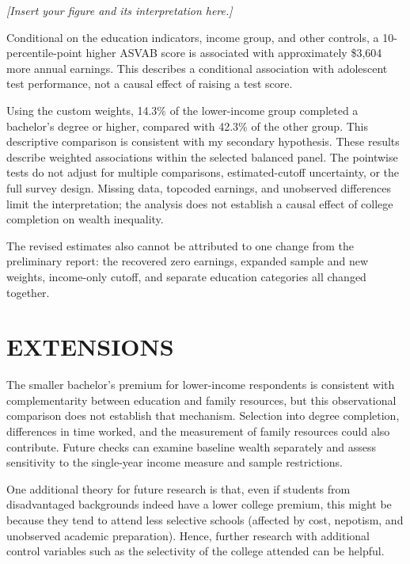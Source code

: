 \documentclass[12pt,letterpaper]{article}
\begin{document}
\textit{[Insert your figure and its interpretation here.]}

Conditional on the education indicators, income group, and other controls, a
10-percentile-point higher ASVAB score is associated with approximately \$3,604
more annual earnings. This describes a conditional association with adolescent
test performance, not a causal effect of raising a test score.

Using the custom weights, 14.3\% of the lower-income group completed a bachelor's
degree or higher, compared with 42.3\% of the other group. This descriptive comparison
is consistent with my secondary hypothesis. These results describe weighted
associations within the selected balanced panel. The pointwise tests do not adjust
for multiple comparisons, estimated-cutoff uncertainty, or the full survey design.
Missing data, topcoded earnings, and unobserved differences
limit the interpretation; the analysis does not establish a causal effect of college
completion on wealth inequality.

The revised estimates also cannot be attributed to one change from the preliminary
report: the recovered zero earnings, expanded sample and new weights, income-only
cutoff, and separate education categories all changed together.

\section*{EXTENSIONS}
The smaller bachelor's premium for lower-income respondents is consistent with
complementarity between education and family resources, but this observational
comparison does not establish that mechanism. Selection into degree completion,
differences in time worked, and the measurement of family resources could also
contribute. Future checks can examine baseline wealth separately and assess
sensitivity to the single-year income measure and sample restrictions.

One additional theory for future research is that, even if students from disadvantaged
backgrounds indeed have a lower college premium, this might be because they tend to
attend less selective schools (affected by cost, nepotism, and unobserved academic
preparation). Hence, further research with additional control variables such as the
selectivity of the college attended can be helpful.
\end{document}
